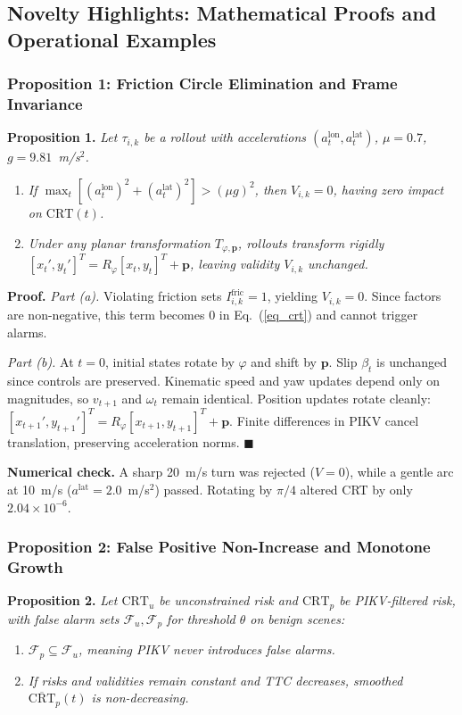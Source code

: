 \documentclass[preprint,12pt]{elsarticle}
\begin{document}
\subsection{Novelty Highlights: Mathematical Proofs and Operational Examples}
\subsubsection{Proposition 1: Friction Circle Elimination and Frame Invariance}
\textbf{Proposition 1.} \textit{Let $\tau_{i,k}$ be a rollout with accelerations $(a^{\text{lon}}_t, a^{\text{lat}}_t)$, $\mu = 0.7$, $g = 9.81$~m/s$^2$.}
\begin{enumerate}
    \item[(a)] \textit{If $\max_t [(a^{\text{lon}}_t)^2 + (a^{\text{lat}}_t)^2] > (\mu g)^2$, then $V_{i,k} = 0$, having zero impact on $\text{CRT}(t)$.}
    \item[(b)] \textit{Under any planar transformation $T_{\varphi, \mathbf{p}}$, rollouts transform rigidly $[x_t', y_t']^T = R_\varphi [x_t, y_t]^T + \mathbf{p}$, leaving validity $V_{i,k}$ unchanged.}
\end{enumerate}

\textbf{Proof.} \textit{Part (a).} Violating friction sets $I^{\text{fric}}_{i,k} = 1$, yielding $V_{i,k} = 0$. Since factors are non-negative, this term becomes 0 in Eq.~(\ref{eq_crt}) and cannot trigger alarms.

\textit{Part (b).} At $t=0$, initial states rotate by $\varphi$ and shift by $\mathbf{p}$. Slip $\beta_t$ is unchanged since controls are preserved. Kinematic speed and yaw updates depend only on magnitudes, so $v_{t+1}$ and $\omega_t$ remain identical. Position updates rotate cleanly: $[x_{t+1}', y_{t+1}']^T = R_\varphi [x_{t+1}, y_{t+1}]^T + \mathbf{p}$. Finite differences in PIKV cancel translation, preserving acceleration norms. \hfill $\blacksquare$

\textbf{Numerical check.} A sharp 20~m/s turn was rejected ($V=0$), while a gentle arc at 10~m/s ($a^{\text{lat}}=2.0$~m/s$^2$) passed. Rotating by $\pi/4$ altered CRT by only $2.04 \times 10^{-6}$.

\subsubsection{Proposition 2: False Positive Non-Increase and Monotone Growth}
\textbf{Proposition 2.} \textit{Let $\text{CRT}_{u}$ be unconstrained risk and $\text{CRT}_{p}$ be PIKV-filtered risk, with false alarm sets $\mathcal{F}_u, \mathcal{F}_p$ for threshold $\theta$ on benign scenes:}
\begin{enumerate}
    \item[(a)] \textit{$\mathcal{F}_p \subseteq \mathcal{F}_u$, meaning PIKV never introduces false alarms.}
    \item[(b)] \textit{If risks and validities remain constant and TTC decreases, smoothed $\overline{\text{CRT}}_p(t)$ is non-decreasing.}
\end{enumerate}
\end{document}
